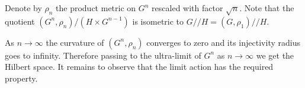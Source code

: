 Denote by $\rho_n$ the product metric on $G^n$ rescaled with factor $\sqrt{n}$.
Note that the quotient $(G^n,\rho_n)/(H\times G^{n-1})$ is isometric to $G/\!\!/H=(G,\rho_1)/\!\!/H$.

As $n\to\infty$ the curvature of $(G^n,\rho_n)$ converges to zero and its injectivity radius goes to infinity.
Therefore passing to the ultra-limit of $G^n$ as $n\to\infty$ we get the Hilbert space.
It remains to observe that the limit action has the required property.
\qeds
